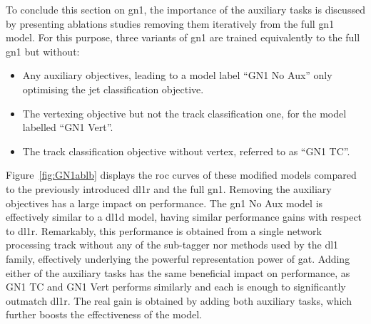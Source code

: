 To conclude this section on \gls{gn1}, the importance of the auxiliary tasks is discussed by presenting ablations studies removing them iteratively from the full \gls{gn1} model. For this purpose, three variants of \gls{gn1} are trained equivalently to the full \gls{gn1} but without:
\begin{itemize}
  \item Any auxiliary objectives, leading to a model label ``GN1 No Aux'' only optimising the jet classification objective.
  \item The vertexing objective but not the track classification one, for the model labelled ``GN1 Vert''.
  \item The track classification objective without vertex, referred to as ``GN1 TC''.
\end{itemize}
Figure~\ref{fig:GN1ablb} displays the \gls{roc} curves of these modified models compared to the previously introduced \gls{dl1r} and the full \gls{gn1}. Removing the auxiliary objectives has a large impact on performance. The \gls{gn1} No Aux model is effectively similar to a \gls{dl1d} model, having similar performance gains with respect to \gls{dl1r}. Remarkably, this performance is obtained from a single network processing track without any of the sub-tagger nor methods used by the \gls{dl1} family, effectively underlying the powerful representation power of \gls{gat}. Adding either of the auxiliary tasks has the same beneficial impact on performance, as GN1 TC and GN1 Vert performs similarly and each is enough to significantly outmatch \gls{dl1r}. The real gain is obtained by adding both auxiliary tasks, which further boosts the effectiveness of the model.

